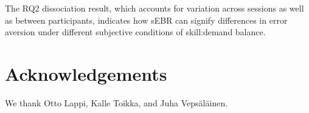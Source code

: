 \documentclass[10pt,letterpaper,floatsintext]{article}
\begin{document}
The RQ2 dissociation result, which accounts for variation across sessions as well as between participants, indicates how sEBR can signify differences in error aversion under different subjective conditions of skill:demand balance.



\section{Acknowledgements}
We thank Otto Lappi, Kalle Toikka, and Juha Veps\"{a}l\"{a}inen.




\setlength{\bibleftmargin}{.125in}
\setlength{\bibindent}{-\bibleftmargin}


\end{document}
